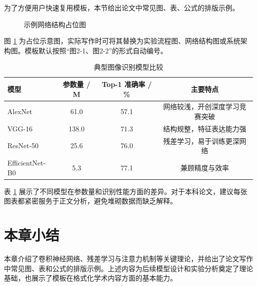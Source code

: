 为了方便用户快速复用模板，本节给出论文中常见图、表、公式的排版示例。

\begin{figure}[htbp]
  \centering
  \fbox{\rule{0pt}{4.2cm}\rule{0.82\textwidth}{0pt}}
  \caption{示例网络结构占位图}
  \label{fig:network}
\end{figure}

图 \ref{fig:network} 为占位示意图，实际写作时可将其替换为实验流程图、网络结构图或系统架构图。模板默认按照“图2-1、图2-2”的形式自动编号。

\begin{table}[htbp]
  \centering
  \caption{典型图像识别模型比较}
  \label{tab:model-compare}
  \begin{tabular}{lccc}
    \toprule
    模型 & 参数量 / M & Top-1 准确率 / \% & 主要特点 \\
    \midrule
    AlexNet & 61.0 & 57.1 & 网络较浅，开创深度学习竞赛突破 \\
    VGG-16 & 138.0 & 71.3 & 结构规整，特征表达能力强 \\
    ResNet-50 & 25.6 & 76.0 & 残差学习，易于训练更深网络 \\
    EfficientNet-B0 & 5.3 & 77.1 & 兼顾精度与效率 \\
    \bottomrule
  \end{tabular}
\end{table}

表 \ref{tab:model-compare} 展示了不同模型在参数量和识别性能方面的差异。对于本科论文，建议每张图表都紧密服务于正文分析，避免堆砌数据而缺乏解释。

\section{本章小结}

本章介绍了卷积神经网络、残差学习与注意力机制等关键理论，并给出了论文写作中常见图、表和公式的排版示例。上述内容为后续模型设计和实验分析奠定了理论基础，也展示了模板在格式化学术内容方面的基本能力。
